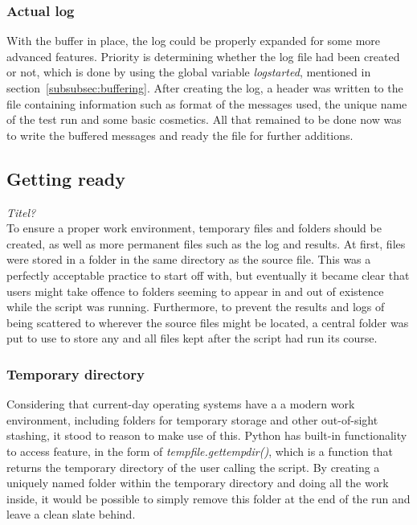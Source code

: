 \documentclass[11pt,british]{article}
\begin{document}
\subsubsection{Actual log}
With the buffer in place, the log could be properly expanded for some more advanced features. Priority is determining whether the log file had been created or not, which is done by using the global variable \emph{logstarted}, mentioned in section~\ref{subsubsec:buffering}. After creating the log, a header was written to the file containing information such as format of the messages used, the unique name of the test run and some basic cosmetics. All that remained to be done now was to write the buffered messages and ready the file for further additions.

\subsection{Getting ready}
\emph{\color{red} Titel?}\\
To ensure a proper work environment, temporary files and folders should be created, as well as more permanent files such as the log and results. At first, files were stored in a  folder in the same directory as the source file. This was a perfectly acceptable practice to start off with, but eventually it became clear that users might take offence to folders seeming to appear in and out of existence while the script was running. Furthermore, to prevent the results and logs of being scattered to wherever the source files might be located, a central folder was put to use to store any and all files kept after the script had run its course.

\subsubsection{Temporary directory}
Considering that current-day operating systems have a a modern work environment, including folders for temporary storage and other out-of-sight stashing, it stood to reason to make use of this. Python has built-in functionality to access feature, in the form of \emph{tempfile.gettempdir()}, which is a function that returns the temporary directory of the user calling the script. By creating a uniquely named folder within the temporary directory and doing all the work inside, it would be possible to simply remove this folder at the end of the run and leave a clean slate behind.
\end{document}
